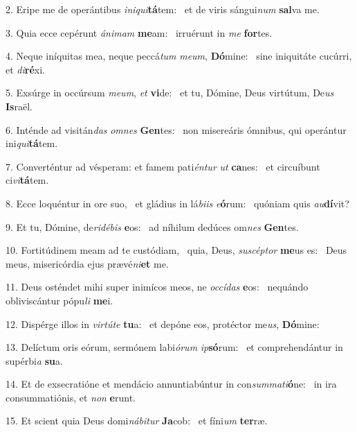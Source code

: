 2. Eripe me de operántibus \textit{in}\textit{i}\textit{qui}\textbf{tá}tem: \ast\  et de viris sángui\textit{num} \textbf{sal}va me.\

3. Quia ecce cepérunt \textit{á}\textit{ni}\textit{mam} \textbf{me}am: \ast\  irruérunt in \textit{me} \textbf{for}tes.\

4. Neque iníquitas mea, neque peccá\textit{tum} \textit{me}\textit{um}, \textbf{Dó}mine: \ast\  sine iniquitáte cucúrri, et \textit{di}\textbf{ré}xi.\

5. Exsúrge in occúrsum \textit{me}\textit{um}, \textit{et} \textbf{vi}de: \ast\  et tu, Dómine, Deus virtútum, De\textit{us} \textbf{Is}raël.\

6. Inténde ad visitán\textit{das} \textit{om}\textit{nes} \textbf{Gen}tes: \ast\  non misereáris ómnibus, qui operántur ini\textit{qui}\textbf{tá}tem.\

7. Converténtur ad vésperam: et famem pati\textit{én}\textit{tur} \textit{ut} \textbf{ca}nes: \ast\  et circuíbunt ci\textit{vi}\textbf{tá}tem.\

8. Ecce loquéntur in ore suo, \dag\  et gládius in lá\textit{bi}\textit{is} \textit{e}\textbf{ó}rum: \ast\  quóniam quis \textit{au}\textbf{dí}vit?\

9. Et tu, Dómine, de\textit{ri}\textit{dé}\textit{bis} \textbf{e}os: \ast\  ad níhilum dedúces om\textit{nes} \textbf{Gen}tes.\

10. Fortitúdinem meam ad te custódiam, \dag\  quia, Deus, \textit{su}\textit{scép}\textit{tor} \textbf{me}us es: \ast\  Deus meus, misericórdia ejus prævé\textit{ni}\textbf{et} me.\

11. Deus osténdet mihi super inimícos meos, ne \textit{oc}\textit{cí}\textit{das} \textbf{e}os: \ast\  nequándo obliviscántur pópu\textit{li} \textbf{me}i.\

12. Dispérge illos in \textit{vir}\textit{tú}\textit{te} \textbf{tu}a: \ast\  et depóne eos, protéctor me\textit{us}, \textbf{Dó}mine:\

13. Delíctum oris eórum, sermónem labi\textit{ó}\textit{rum} \textit{ip}\textbf{só}rum: \ast\  et comprehendántur in supérbi\textit{a} \textbf{su}a.\

14. Et de exsecratióne et mendácio annuntiabúntur in con\textit{sum}\textit{ma}\textit{ti}\textbf{ó}ne: \ast\  in ira consummatiónis, et \textit{non} \textbf{e}runt.\

15. Et scient quia Deus domi\textit{ná}\textit{bi}\textit{tur} \textbf{Ja}cob: \ast\  et fíni\textit{um} \textbf{ter}ræ.\

